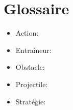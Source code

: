 %

\chapter{Glossaire}
\label{s:glossaire}

\begin{itemize}
    \item Action:
        \\
    \item Entra\^ineur:
        \\
    \item Obstacle:
        \\
    \item Projectile:
        \\
    \item Stratégie:
        \\
\end{itemize}
